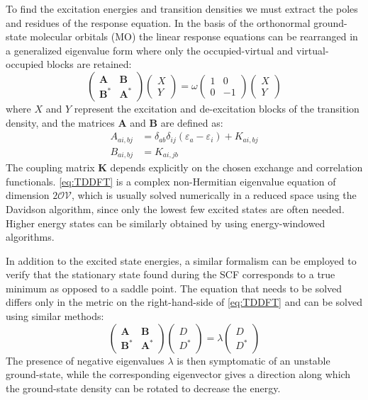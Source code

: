 \documentclass[12pt]{article}
\begin{document}
To find the excitation energies and transition densities we must extract the poles and residues of the response equation. In the basis of the orthonormal ground-state molecular orbitals (MO) the linear response equations can be rearranged in a generalized eigenvalue form where only the occupied-virtual and virtual-occupied blocks are retained:
\begin{equation}
\label{eq:TDDFT}
 \begin{pmatrix} \mathbf{A} & \mathbf{B} \\ \mathbf{B}^* & \mathbf{A}^* \end{pmatrix}
 \begin{pmatrix} X \\ Y \end{pmatrix} = \omega\begin{pmatrix} 1 & 0 \\ 0 & -1 \end{pmatrix}
 \begin{pmatrix} X \\ Y \end{pmatrix}
\end{equation}
where $X$ and $Y$ represent the excitation and de-excitation blocks of the transition density, and the matrices $\mathbf{A}$ and $\mathbf{B}$ are defined as:
\begin{align}
 A_{ai,bj} &= \delta_{ab}\delta_{ij}(\varepsilon_a-\varepsilon_i) + K_{ai,bj} \\
 B_{ai,bj} &= K_{ai,jb}
\end{align}
The coupling matrix $\mathbf{K}$ depends explicitly on the chosen exchange and correlation functionals. \cref{eq:TDDFT} is a complex non-Hermitian eigenvalue equation of dimension $2\mathcal{OV}$, which is usually solved numerically in a reduced space using the Davidson algorithm,\cite{Davidson_1975} since only the lowest few excited states are often needed.
Higher energy states can be similarly obtained by using energy-windowed algorithms.\cite{Li15_4146,Li11_3540}

In addition to the excited state energies, a similar formalism can be employed to verify that the stationary state found during the SCF corresponds to a true minimum as opposed to a saddle point. The equation that needs to be solved differs only in the metric on the right-hand-side of \cref{eq:TDDFT} and can be solved using similar methods:\cite{Pople77_3045}
\begin{equation}
\label{eq:stab}
 \begin{pmatrix} \mathbf{A} & \mathbf{B} \\ \mathbf{B}^* & \mathbf{A}^* \end{pmatrix}
 \begin{pmatrix} D \\ D^* \end{pmatrix} = \lambda\begin{pmatrix} D \\ D^* \end{pmatrix}
\end{equation}
The presence of negative eigenvalues $\lambda$ is then symptomatic of an unstable ground-state, while the corresponding eigenvector gives a direction along which the ground-state density can be rotated to decrease the energy.
\end{document}
